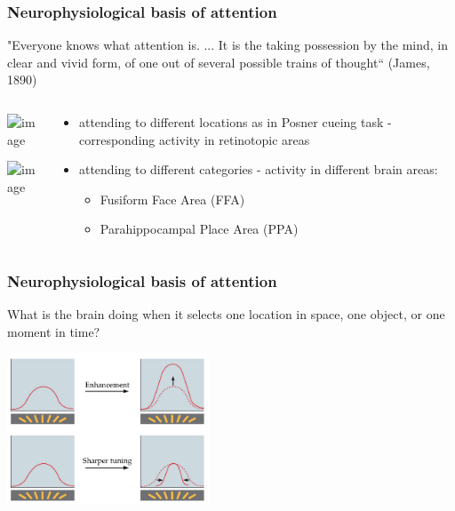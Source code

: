 \documentclass[]{beamer}
\begin{document}
\begin{frame}
 \frametitle{Neurophysiological basis of attention}
\begin{overlayarea}{120mm}{80mm}
 "Everyone knows what attention is. ... It is the taking possession by the mind, in clear and vivid form, of one out of several possible trains of thought`` (James, 1890)\\
\vspace{3mm}


\begin{columns}[T]
 \begin{column}{35mm}
\includegraphics<3>[width=35mm]{figs/l8/fmri_spatial_attention.png}
\begin{center}
\includegraphics<4->[width=55mm]{figs/l8/fmri_object_attention.png}
\end{center}
 \end{column}

 \begin{column}{75mm}
\begin{itemize}
 \setlength{\itemsep}{8pt}
 \item<3-> attending to different locations as in Posner cueing task -  corresponding activity in retinotopic areas
 \item<4-> attending to different categories - activity in different brain areas:
\begin{itemize} 
 \item[] Fusiform Face Area (FFA) 
 \item[] Parahippocampal Place Area (PPA)
\end{itemize}
\end{itemize}
 \end{column}
\end{columns}
\end{overlayarea}
\end{frame}

\begin{frame}
 \frametitle{Neurophysiological basis of attention}
\begin{overlayarea}{120mm}{60mm}

What is the brain doing when it selects one location in space, one object, or one moment in time?

\begin{center}
\includegraphics[width=60mm]{figs/l8/attention_tuning.png}
\end{center}
\end{overlayarea}
\end{frame}
\end{document}
